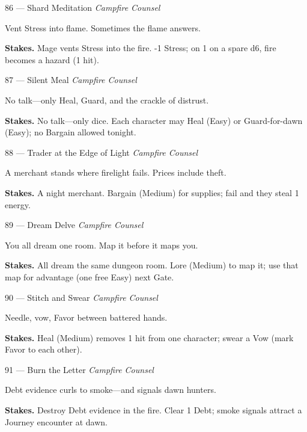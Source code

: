 \begin{encounterentry}{86 --- Shard Meditation}
\textit{Campfire Counsel}

Vent Stress into flame. Sometimes the flame answers.

\textbf{Stakes.} Mage vents Stress into the fire. -1 Stress; on 1 on a spare d6, fire becomes a hazard (1 hit).
\end{encounterentry}

\begin{encounterentry}{87 --- Silent Meal}
\textit{Campfire Counsel}

No talk---only Heal, Guard, and the crackle of distrust.

\textbf{Stakes.} No talk---only dice. Each character may Heal (Easy) or Guard-for-dawn (Easy); no Bargain allowed tonight.
\end{encounterentry}

\begin{encounterentry}{88 --- Trader at the Edge of Light}
\textit{Campfire Counsel}

A merchant stands where firelight fails. Prices include theft.

\textbf{Stakes.} A night merchant. Bargain (Medium) for supplies; fail and they steal 1 energy.
\end{encounterentry}

\begin{encounterentry}{89 --- Dream Delve}
\textit{Campfire Counsel}

You all dream one room. Map it before it maps you.

\textbf{Stakes.} All dream the same dungeon room. Lore (Medium) to map it; use that map for advantage (one free Easy) next Gate.
\end{encounterentry}

\begin{encounterentry}{90 --- Stitch and Swear}
\textit{Campfire Counsel}

Needle, vow, Favor between battered hands.

\textbf{Stakes.} Heal (Medium) removes 1 hit from one character; swear a Vow (mark Favor to each other).
\end{encounterentry}

\begin{encounterentry}{91 --- Burn the Letter}
\textit{Campfire Counsel}

Debt evidence curls to smoke---and signals dawn hunters.

\textbf{Stakes.} Destroy Debt evidence in the fire. Clear 1 Debt; smoke signals attract a Journey encounter at dawn.
\end{encounterentry}

